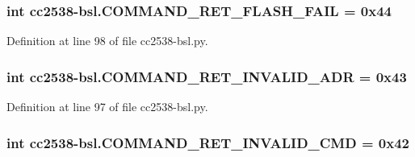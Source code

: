 \subsubsection[{\texorpdfstring{C\+O\+M\+M\+A\+N\+D\+\_\+\+R\+E\+T\+\_\+\+F\+L\+A\+S\+H\+\_\+\+F\+A\+IL}{COMMAND_RET_FLASH_FAIL}}]{\setlength{\rightskip}{0pt plus 5cm}int cc2538-\/bsl.\+C\+O\+M\+M\+A\+N\+D\+\_\+\+R\+E\+T\+\_\+\+F\+L\+A\+S\+H\+\_\+\+F\+A\+IL = 0x44}\hypertarget{namespacecc2538-bsl_ab7f920b6c58b607b8fe6c3e8163e3f89}{}\label{namespacecc2538-bsl_ab7f920b6c58b607b8fe6c3e8163e3f89}


Definition at line 98 of file cc2538-\/bsl.\+py.

\subsubsection[{\texorpdfstring{C\+O\+M\+M\+A\+N\+D\+\_\+\+R\+E\+T\+\_\+\+I\+N\+V\+A\+L\+I\+D\+\_\+\+A\+DR}{COMMAND_RET_INVALID_ADR}}]{\setlength{\rightskip}{0pt plus 5cm}int cc2538-\/bsl.\+C\+O\+M\+M\+A\+N\+D\+\_\+\+R\+E\+T\+\_\+\+I\+N\+V\+A\+L\+I\+D\+\_\+\+A\+DR = 0x43}\hypertarget{namespacecc2538-bsl_a19cccd46f4e548d88322ef19bca4fbdb}{}\label{namespacecc2538-bsl_a19cccd46f4e548d88322ef19bca4fbdb}


Definition at line 97 of file cc2538-\/bsl.\+py.

\subsubsection[{\texorpdfstring{C\+O\+M\+M\+A\+N\+D\+\_\+\+R\+E\+T\+\_\+\+I\+N\+V\+A\+L\+I\+D\+\_\+\+C\+MD}{COMMAND_RET_INVALID_CMD}}]{\setlength{\rightskip}{0pt plus 5cm}int cc2538-\/bsl.\+C\+O\+M\+M\+A\+N\+D\+\_\+\+R\+E\+T\+\_\+\+I\+N\+V\+A\+L\+I\+D\+\_\+\+C\+MD = 0x42}\hypertarget{namespacecc2538-bsl_a225ced7eee00b2e93a98515cf4593c28}{}\label{namespacecc2538-bsl_a225ced7eee00b2e93a98515cf4593c28}


